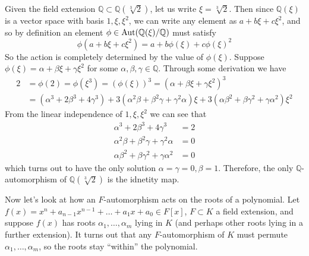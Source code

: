   \begin{example}
    Given the field extension $\mathbb{Q} \subset \mathbb{Q}(\sqrt[3]{2})$, let us write $\xi = \sqrt[3]{2}$. Then since $\mathbb{Q}(\xi)$ is a vector space with basis $1, \xi, \xi^2$, we can write any element as $a + b \xi + c \xi^2$, and so by definition an element $\phi \in \Aut(\mathbb{Q}(\xi)/\mathbb{Q})$ must satisfy 
    \begin{equation}
      \phi(a + b \xi + c \xi^2) = a + b \phi(\xi) + c \phi(\xi)^2
    \end{equation}
    So the action is completely determined by the value of $\phi(\xi)$. Suppose $\phi(\xi) = \alpha + \beta \xi + \gamma \xi^2$ for some $\alpha, \beta, \gamma \in \mathbb{Q}$. Through some derivation we have 
    \begin{align}
      2 & = \phi(2) = \phi(\xi^3) = (\phi(\xi))^3 = (\alpha + \beta \xi + \gamma \xi^2)^3 \\ 
        & = (\alpha^3 + 2\beta^3 + 4\gamma^3) + 3(\alpha^2\beta + \beta^2\gamma + \gamma^2\alpha)\xi + 3(\alpha\beta^2 + \beta\gamma^2 + \gamma\alpha^2)\xi^2
    \end{align} 
    From the linear independence of $1, \xi, \xi^2$ we can see that 
    \begin{align}
      \alpha^3 + 2\beta^3 + 4\gamma^3 &= 2 \\
      \alpha^2\beta + \beta^2\gamma + \gamma^2\alpha &= 0 \\
      \alpha\beta^2 + \beta\gamma^2 + \gamma\alpha^2 &= 0
    \end{align}
    which turns out to have the only solution $\alpha = \gamma = 0, \beta = 1$. Therefore, the only $\mathbb{Q}$-automorphism of $\mathbb{Q}(\sqrt[3]{2})$ is the idnetity map. 
  \end{example} 

  Now let's look at how an $F$-automorphism acts on the roots of a polynomial. Let $f(x) = x^n + a_{n-1} x^{n-1} + \ldots + a_1 x + a_0 \in F[x]$, $F \subset K$ a field extension, and suppose $f(x)$ has roots $\alpha_1, \ldots, \alpha_m$ lying in $K$ (and perhaps other roots lying in a further extension). It turns out that any $F$-automorphism of $K$ must permute $\alpha_1, \ldots, \alpha_m$, so the roots stay ``within'' the polynomial. 

